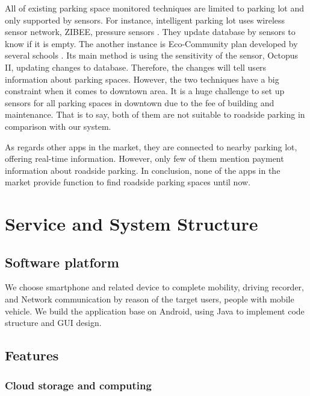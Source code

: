 \documentclass[runningheads,a4paper]{llncs}
\begin{document}
All of existing parking space monitored techniques are limited to
parking lot and only supported by sensors. For instance, intelligent
parking lot uses wireless sensor network, ZIBEE, pressure sensors
\cite{PaymentSystem, IOV2015}.
They update database by sensors to know if it is empty. The another
instance is Eco-Community plan developed by several schools
\cite{EcoCommunity}. Its
main method is using the sensitivity of the sensor, Octopus II,
updating changes to database. Therefore, the changes will tell users
information about parking spaces. However, the two techniques have a big
constraint when it comes to downtown area. It is a huge challenge to set
up sensors for all parking spaces in downtown due to the fee of building
and maintenance. That is to say, both of them are not suitable to
roadside parking in comparison with our system.

As regards other apps in the market, they are connected to nearby
parking lot, offering real-time information. However, only few of
them mention payment information about roadside parking. In conclusion,
none of the apps in the market provide function to find roadside parking
spaces until now.

\section{Service and System Structure}\label{sec:service}

%
\subsection{Software platform}
%

We choose smartphone and related device to complete mobility, driving
recorder, and Network communication by reason of the target users,
people with mobile vehicle. We build the application base on Android,
using Java to implement code structure and GUI design.

%
\subsection{Features}
%

%
\subsubsection{Cloud storage and computing}
%
\end{document}
